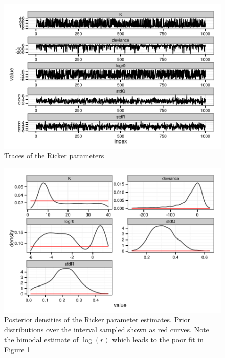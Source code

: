 \documentclass[author-year, review]{elsarticle} %
\makeatletter
\def\maxwidth{\ifdim\Gin@nat@width>\linewidth\linewidth
\else\Gin@nat@width\fi}
\let\Oldincludegraphics\includegraphics
\renewcommand{\includegraphics}[1]{\Oldincludegraphics[width=\maxwidth]{#1}}
\makeatother
\begin{document}
\begin{figure}[htbp]
\centering
\includegraphics{ricker_traces.pdf}
\caption{Traces of the Ricker parameters}
\end{figure}

\begin{figure}[htbp]
\centering
\includegraphics{ricker_posteriors.pdf}
\caption{Posterior densities of the Ricker parameter estimates. Prior
distributions over the interval sampled shown as red curves. Note the
bimodal estimate of $\log(r)$ which leads to the poor fit in Figure 1}
\end{figure}
\end{document}
